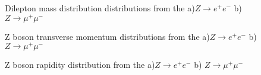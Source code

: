 \begin{figure}[h]
\begin{minipage}[h]{0.49\linewidth}
\end{minipage}
\hfill
\begin{minipage}[h]{0.49\linewidth}
\end{minipage}
\caption{Dilepton mass distribution distributions from the a)$Z\to e^{+}e^{-}$ b) $Z\to \mu^{+}\mu^{-}$}

\end{figure}

\begin{figure}[h]
\begin{minipage}[h]{0.49\linewidth}
\end{minipage}
\hfill
\begin{minipage}[h]{0.49\linewidth}
\end{minipage}

\caption{ Z boson transverse momentum distributions from the a)$Z\to e^{+}e^{-}$ b) $Z\to \mu^{+}\mu^{-}$}
\end{figure}


\begin{figure}[h]
\begin{minipage}[h]{0.49\linewidth}
\end{minipage}
\hfill
\begin{minipage}[h]{0.49\linewidth}
\end{minipage}

\caption{ Z boson rapidity distribution from the a)$Z\to e^{+}e^{-}$ b) $Z\to \mu^{+}\mu^{-}$}
\label{ris:Zll2}
\end{figure}
